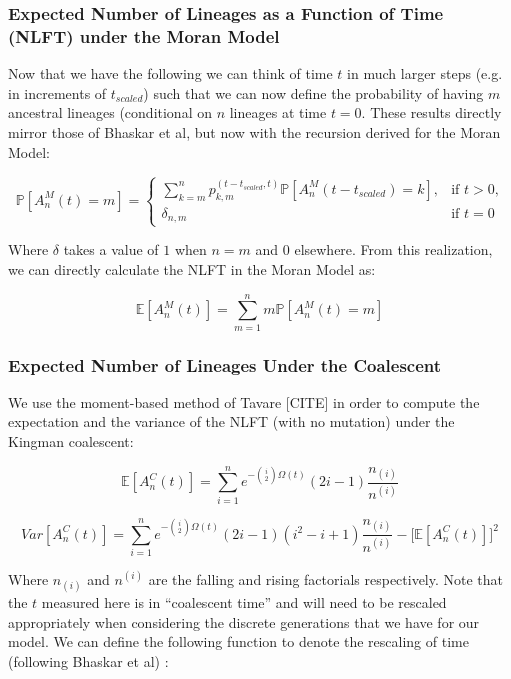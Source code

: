\documentclass[11pt]{article}
\begin{document}
\subsubsection{Expected Number of Lineages as a Function of Time (NLFT) under the Moran Model}

Now that we have the following we can think of time $t$ in much larger steps (e.g. in increments of $t_{scaled}$) such that we can now define the probability of having $m$ ancestral lineages (conditional on $n$ lineages at time $t = 0$. These results directly mirror those of Bhaskar et al, but now with the recursion derived for the Moran Model:

 \begin{equation*}
	 \mathbb{P}[A^M_n(t) = m] =
	 \begin{cases} 
		 \sum^n_{k=m}  p^{(t-t_{scaled}, t)}_{k,m} \mathbb{P}[A^M_n (t-t_{scaled}) = k],  &\text{if $t > 0$,}
	 	 \\
		 \delta_{n,m} &\text{if $t = 0$}
	 \end{cases}
 \end{equation*}

 Where $\delta$ takes a value of $1$ when $n=m$ and $0$ elsewhere. From this realization, we can directly calculate the NLFT in the Moran Model as:

 \begin{equation*}
	 \mathbb{E}[A^M_n(t)] = \sum^n_{m=1} m \mathbb{P}[A^M_n (t) = m]
 \end{equation*}

\subsubsection*{Expected Number of Lineages Under the Coalescent}

We use the moment-based method of Tavare [CITE] in order to compute the expectation and the variance of the NLFT (with no mutation) under the Kingman coalescent:

\begin{equation*}
	\mathbb{E}[A^C_n(t)] = \sum^n_{i=1} e^{-\binom{i}{2}\Omega(t)} (2i - 1) \frac{n_{(i)}}{n^{(i)}} 
\end{equation*}

\begin{equation*}
	Var[A^C_n(t)] = \sum^n_{i=1} e^{-\binom{i}{2}\Omega(t)}(2i-1)(i^2 - i + 1)\frac{n_{(i)}}{n^{(i)}} - \Bigg[\mathbb{E}[A^C_n(t)]\Bigg]^2
\end{equation*}

Where $n_{(i)}$ and $n^{(i)}$ are the falling and rising factorials respectively. Note that the $t$ measured here is in ``coalescent time'' and will need to be rescaled appropriately when considering the discrete generations that we have for our model. We can define the following function to denote the rescaling of time (following Bhaskar et al) :
\end{document}
